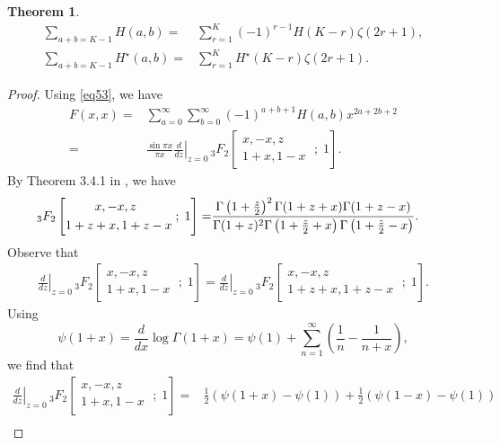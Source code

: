 \documentclass[reqno]{amsart}
\newtheorem{theorem}{Theorem}[section]
\theoremstyle{definition}
\theoremstyle{remark}
\numberwithin{equation}{section}
\begin{document}
\begin{theorem}
\begin{align}
\sum_{a+b=K-1}H(a,b)=&\sum_{r=1}^K(-1)^{r-1}H(K-r)\zeta(2r+1)\label{eq61},\\
\sum_{a+b=K-1}H^{\star}(a,b)=& \sum_{r=1}^{K}H^{\star}(K-r)\zeta(2r+1).\label{eq62}
\end{align}
\end{theorem}
\begin{proof}
Using \eqref{eq53}, we have
\begin{equation}\label{eq70}\begin{split}
F(x,x)=&\sum_{a=0}^{\infty}\sum_{b=0}^{\infty} (-1)^{a+b+1}H(a,b)x^{2a+2b+2}\\
=&\frac{\sin\pi x}{\pi x}\left.\frac{d}{dz}\right|_{z=0} \,_3F_2\left[\begin{aligned} x,-x,z\quad\\1+x,1-x\end{aligned}\;;\;1\right].
\end{split}\end{equation}
By Theorem 3.4.1 in \cite{4}, we have
\begin{align*}
\,_3F_2\left[\begin{aligned} x,-x,z\hspace{1cm}\\1+z+x,1+z-x\end{aligned}\;;\;1\right]=&\frac{{\displaystyle}\Gamma\left(1+\frac{z}{2}\right)^2\Gamma(1+z+x)\Gamma(1+z-x)}{{\displaystyle}
\Gamma(1+z)^2\Gamma\left(1+\frac{z}{2}+x\right)\Gamma\left(1+\frac{z}{2}-x\right)}.
\end{align*}
Observe that
\begin{align*}
\left.\frac{d}{dz}\right|_{z=0} \,_3F_2\left[\begin{aligned} x,-x,z\quad\\1+x,1-x\end{aligned}\;;\;1\right]=\left.\frac{d}{dz}\right|_{z=0} \,_3F_2\left[\begin{aligned} x,-x,z\hspace{1cm}\\1+z+x,1+z-x\end{aligned}\;;\;1\right].
\end{align*}Using
$$\psi(1+x)=\frac{d}{dx}\log\Gamma(1+x)=\psi(1)+\sum_{n=1}^{\infty}\left(\frac{1}{n}-\frac{1}{n+x}\right),$$we find that
\begin{align*}
\left.\frac{d}{dz}\right|_{z=0} \,_3F_2\left[\begin{aligned} x,-x,z\quad\\1+x,1-x\end{aligned}\;;\;1\right]=&\frac{1}{2}\left(\psi(1+x)-\psi(1)\right)+\frac{1}{2}\left(\psi(1-x)-\psi(1)\right)\\

\end{align*}
\end{proof}
\end{document}
